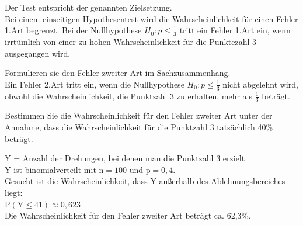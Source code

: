 \documentclass[10pt]{article}
\begin{document}
Der Test entspricht der genannten Zielsetzung.\\
Bei einem einseitigen Hypothesentest wird die Wahrscheinlichkeit für einen Fehler 1.Art begrenzt. Bei der Nullhypothese $H_{0}: p \leq \frac{1}{3}$ tritt ein Fehler 1.Art ein, wenn irrtümlich von einer zu hohen Wahrscheinlichkeit für die Punktezahl 3 ausgegangen wird.

Formulieren sie den Fehler zweiter Art im Sachzusammenhang.\\
Ein Fehler 2.Art tritt ein, wenn die Nullhypothese $H_{0}: p \leq \frac{1}{3}$ nicht abgelehnt wird, obwohl die Wahrscheinlichkeit, die Punktzahl 3 zu erhalten, mehr als $\frac{1}{3}$ beträgt.

Bestimmen Sie die Wahrscheinlichkeit für den Fehler zweiter Art unter der Annahme, dass die Wahrscheinlichkeit für die Punktzahl 3 tatsächlich 40\% beträgt.

Y = Anzahl der Drehungen, bei denen man die Punktzahl 3 erzielt\\
Y ist binomialverteilt mit $\mathrm{n}=100$ und $\mathrm{p}=0,4$.\\
Gesucht ist die Wahrscheinlichkeit, dass Y außerhalb des Ablehnungsbereiches liegt:\\
$\mathrm{P}(\mathrm{Y} \leq 41) \approx 0,623$\\
Die Wahrscheinlichkeit für den Fehler zweiter Art beträgt ca. 62,3\%.
\end{document}
